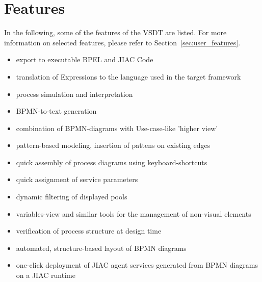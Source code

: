 \section{Features}


In the following, some of the features of the VSDT are listed.  For more information
on selected features, please refer to Section~\ref{sec:user_features}.

\begin{itemize}
	\item export to executable BPEL and JIAC Code%
	\item translation of Expressions to the language used in the target framework
	\item process simulation and interpretation
	\item BPMN-to-text generation
	\item combination of BPMN-diagrams with Use-case-like 'higher view'
	\item pattern-based modeling, insertion of pattens on existing edges
	\item quick assembly of process diagrams using keyboard-shortcuts
	\item quick assignment of service parameters
	\item dynamic filtering of displayed pools
	\item variables-view and similar tools for the management of non-visual elements
	\item verification of process structure at design time
	\item automated, structure-based layout of BPMN diagrams
	\item one-click deployment of JIAC agent services generated from BPMN diagrams on a JIAC runtime
\end{itemize}

